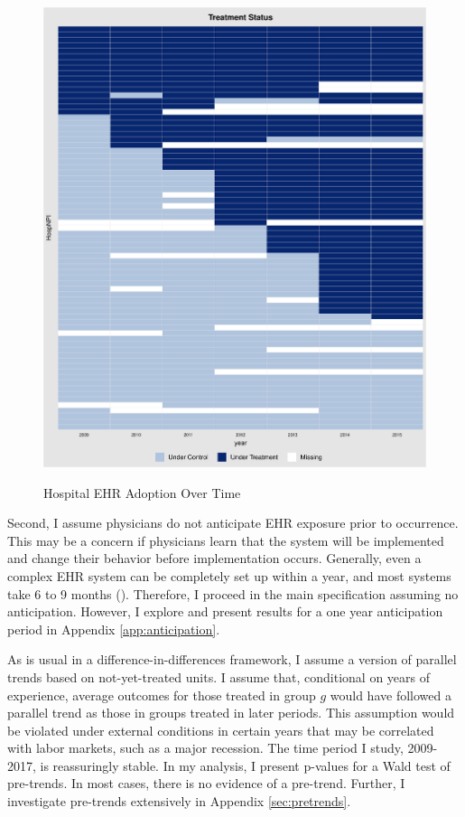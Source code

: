 \documentclass[12pt]{article}
\begin{document}
\begin{figure}[ht!]
    \centering
    \captionsetup{width=.7\linewidth}
    \caption{Hospital EHR Adoption Over Time}
    \includegraphics[scale=.5]{Objects/hosp_treat.pdf}
    \label{fig:hosp_treat}
\end{figure}

Second, I assume physicians do not anticipate EHR exposure prior to occurrence. This may be a concern if physicians learn that the system will be implemented and change their behavior before implementation occurs. Generally, even a complex EHR system can be completely set up within a year, and most systems take 6 to 9 months (\cite{uzialko_2021}). Therefore, I proceed in the main specification assuming no anticipation. However, I explore and present results for a one year anticipation period in Appendix \ref{app:anticipation}. 

As is usual in a difference-in-differences framework, I assume a version of parallel trends based on not-yet-treated units. I assume that, conditional on years of experience, average outcomes for those treated in group $g$ would have followed a parallel trend as those in groups treated in later periods. This assumption would be violated under external conditions in certain years that may be correlated with labor markets, such as a major recession. The time period I study, 2009-2017, is reassuringly stable. In my analysis, I present p-values for a Wald test of pre-trends. In most cases, there is no evidence of a pre-trend. Further, I investigate pre-trends extensively in Appendix \ref{sec:pretrends}. 
\end{document}
